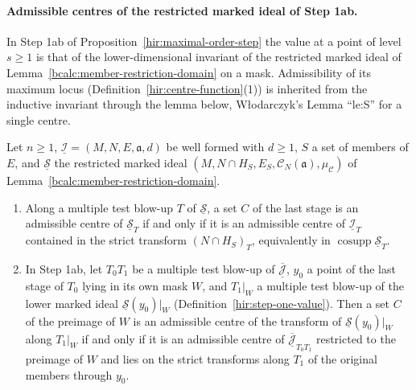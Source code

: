\paragraph{Admissible centres of the restricted marked ideal of Step 1ab.} In Step 1ab of Proposition~\ref{hir:maximal-order-step} the value at a
point of level \(s\ge1\) is that of the lower-dimensional invariant of the restricted marked ideal of Lemma~\ref{bcalc:member-restriction-domain} on a mask.
Admissibility of its maximum locus (Definition~\ref{hir:centre-function}(1)) is inherited from the inductive invariant through the lemma below, Włodarczyk's
Lemma ``le:S'' for a single centre.

\begin{lemma}
\label{bcalc:member-restrict-admissible}
\upstreamleanok
Let \(n\ge1\), \(\underline{\mathcal I}=(M,N,E,\mathfrak a,d)\) be well formed with \(d\ge1\), \(S\) a set of members of \(E\), and \(\underline{\mathcal S}\) the restricted marked ideal
\((M,N\cap H_S,E_S,\mathcal C_N(\mathfrak a),\mu_{\mathcal C})\) of Lemma~\ref{bcalc:member-restriction-domain}.
\begin{enumerate}
\item Along a multiple test blow-up \(T\) of \(\underline{\mathcal S}\), a set \(C\) of the last stage is an admissible centre of \(\underline{\mathcal S}_T\) if and only if it is an
admissible centre of \(\underline{\mathcal I}_T\) contained in the strict transform \((N\cap H_S)_T\), equivalently in \(\operatorname{cosupp}\underline{\mathcal S}_T\).
\item In Step 1ab, let \(T_0T_1\) be a multiple test blow-up of \(\overline{\underline{\mathcal J}}\), \(y_0\) a point of the last stage of \(T_0\) lying in its own mask \(W\), and
\(T_1|_W\) a multiple test blow-up of the lower marked ideal \(\underline{\mathcal S}(y_0)|_W\) (Definition~\ref{hir:step-one-value}). Then a set \(C\) of the preimage of \(W\) is an
admissible centre of the transform of \(\underline{\mathcal S}(y_0)|_W\) along \(T_1|_W\) if and only if it is an admissible centre of \(\overline{\underline{\mathcal J}}_{T_0T_1}\)
restricted to the preimage of \(W\) and lies on the strict transforms along \(T_1\) of the original members through \(y_0\).
\end{enumerate}
\end{lemma}
